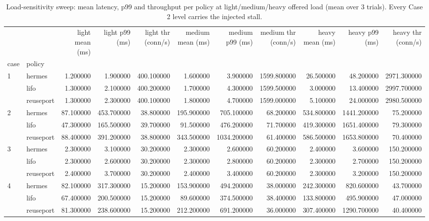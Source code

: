 \begin{table}
\caption{Load-sensitivity sweep: mean latency, p99 and throughput per policy at light/medium/heavy offered load (mean over 3 trials). Every Case 2 level carries the injected stall.}
\label{tab:load-sweep}
\begin{tabular}{llrrrrrrrrr}
\toprule
 &  & light mean (ms) & light p99 (ms) & light thr (conn/s) & medium mean (ms) & medium p99 (ms) & medium thr (conn/s) & heavy mean (ms) & heavy p99 (ms) & heavy thr (conn/s) \\
case & policy &  &  &  &  &  &  &  &  &  \\
\midrule
\multirow[t]{3}{*}{1} & hermes & 1.200000 & 1.900000 & 400.100000 & 1.600000 & 3.900000 & 1599.800000 & 26.500000 & 48.200000 & 2971.300000 \\
 & lifo & 1.300000 & 2.100000 & 400.200000 & 1.700000 & 4.300000 & 1599.500000 & 3.000000 & 13.400000 & 2997.700000 \\
 & reuseport & 1.300000 & 2.300000 & 400.100000 & 1.800000 & 4.700000 & 1599.000000 & 5.100000 & 24.000000 & 2980.500000 \\
\cline{1-11}
\multirow[t]{3}{*}{2} & hermes & 87.100000 & 453.700000 & 38.800000 & 195.900000 & 705.100000 & 68.200000 & 534.800000 & 1441.200000 & 75.200000 \\
 & lifo & 47.300000 & 165.500000 & 39.700000 & 91.500000 & 476.200000 & 71.700000 & 419.300000 & 1651.400000 & 79.300000 \\
 & reuseport & 88.400000 & 391.200000 & 38.800000 & 343.500000 & 1034.200000 & 61.400000 & 586.500000 & 1653.800000 & 70.400000 \\
\cline{1-11}
\multirow[t]{3}{*}{3} & hermes & 2.300000 & 3.100000 & 30.200000 & 2.300000 & 2.600000 & 60.200000 & 2.400000 & 3.600000 & 150.200000 \\
 & lifo & 2.300000 & 2.600000 & 30.200000 & 2.300000 & 2.800000 & 60.200000 & 2.300000 & 2.700000 & 150.200000 \\
 & reuseport & 2.400000 & 3.700000 & 30.200000 & 2.400000 & 3.400000 & 60.200000 & 2.300000 & 3.200000 & 150.200000 \\
\cline{1-11}
\multirow[t]{3}{*}{4} & hermes & 82.100000 & 317.300000 & 15.200000 & 153.900000 & 494.200000 & 38.000000 & 242.300000 & 820.600000 & 43.700000 \\
 & lifo & 67.400000 & 200.500000 & 15.200000 & 89.600000 & 374.500000 & 38.400000 & 133.800000 & 495.900000 & 47.000000 \\
 & reuseport & 81.300000 & 238.600000 & 15.200000 & 212.200000 & 691.200000 & 36.000000 & 307.400000 & 1290.700000 & 40.400000 \\
\cline{1-11}
\bottomrule
\end{tabular}
\end{table}
